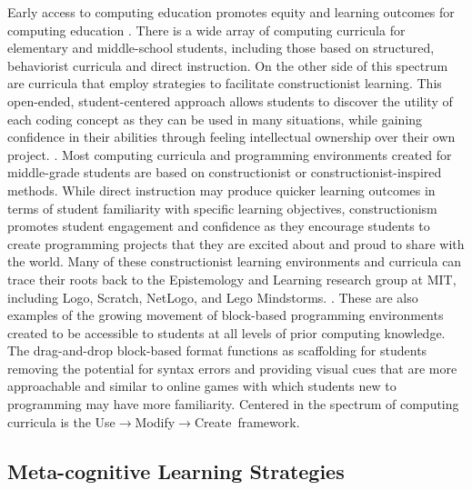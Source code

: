 \documentclass[sigconf,manuscript,review,anonymous]{acmart} %
\def\umc{Use\begin{math}\rightarrow\end{math}Modify\begin{math}\rightarrow\end{math}Create\ }
\begin{document}
Early access to computing education promotes equity and learning outcomes for computing education \cite{harel1990, Papert:1980, Papert:1979}. There is a wide array of computing curricula for elementary and middle-school students, including those based on structured, behaviorist curricula and direct instruction. On the other side of this spectrum are curricula that employ strategies to facilitate constructionist learning. This open-ended, student-centered approach allows students to discover the utility of each coding concept as they can be used in many situations, while gaining confidence in their abilities through feeling intellectual ownership over their own project. \cite{papert1993children, papert1991situating}. Most computing curricula and programming environments created for middle-grade students are based on constructionist or constructionist-inspired methods. While direct instruction may produce quicker learning outcomes in terms of student familiarity with specific learning objectives, constructionism promotes student engagement and confidence as they encourage students to create programming projects that they are excited about and proud to share with the world. \cite{brennan2012new, 10.1145/1345375.1345438} Many of these constructionist learning environments and curricula can trace their roots back to the Epistemology and Learning research group at MIT, including Logo, Scratch, NetLogo, and Lego Mindstorms. \cite{tippnsee, franklin2020Scratchencore}. These are also examples of the growing movement of block-based programming environments created to be accessible to students at all levels of prior computing knowledge. The drag-and-drop block-based format functions as scaffolding for students removing the potential for syntax errors and providing visual cues that are more approachable and similar to online games with which students new to programming may have more familiarity. \cite{Weintrop:2019, weintrop2017blockly, Weintrop:2015} Centered in the spectrum of computing curricula is the \umc framework.

\subsection{Meta-cognitive Learning Strategies}
\end{document}

